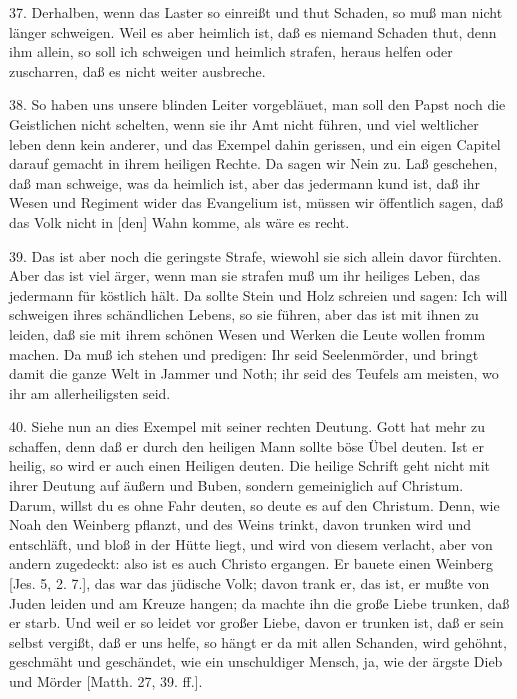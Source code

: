 37. Derhalben, wenn das Laster so einreißt und thut Schaden, so muß man nicht länger schweigen. Weil es aber heimlich ist, daß es niemand Schaden thut, denn ihm allein, so soll ich schweigen und heimlich strafen, heraus helfen oder zuscharren, daß es nicht weiter ausbreche.

38. So haben uns unsere blinden Leiter vorgebläuet, man soll den Papst noch die Geistlichen nicht schelten, wenn sie ihr Amt nicht führen, und viel weltlicher leben denn kein anderer, und das Exempel dahin gerissen, und ein eigen Capitel darauf gemacht in ihrem heiligen Rechte. Da sagen wir Nein zu. Laß geschehen, daß man schweige, was da heimlich ist, aber das jedermann kund ist, daß ihr Wesen und Regiment wider das Evangelium ist, müssen wir öffentlich sagen, daß das Volk nicht in [den] Wahn komme, als wäre es recht.

39. Das ist aber noch die geringste Strafe, wiewohl sie sich allein davor fürchten. Aber das ist viel ärger, wenn man sie strafen muß um ihr heiliges Leben, das jedermann für köstlich hält. Da sollte Stein und Holz schreien und sagen: Ich will schweigen ihres schändlichen Lebens, so sie führen, aber das ist mit ihnen zu leiden, daß sie mit ihrem schönen Wesen und Werken die Leute wollen fromm machen. Da muß ich stehen und predigen: Ihr seid Seelenmörder, und bringt damit die ganze Welt in Jammer und Noth; ihr seid des Teufels am meisten, wo ihr am allerheiligsten seid.

40. Siehe nun an dies Exempel mit seiner rechten Deutung. Gott hat mehr zu schaffen, denn daß er durch den heiligen Mann sollte böse
Übel deuten. Ist er heilig, so wird er auch einen Heiligen deuten. Die heilige Schrift geht nicht mit ihrer Deutung auf äußern und Buben, sondern gemeiniglich auf Christum. Darum, willst du es ohne Fahr deuten, so deute es auf den Christum. Denn, wie Noah den Weinberg pflanzt, und des Weins trinkt, davon trunken wird und entschläft, und bloß in der Hütte liegt, und wird von diesem verlacht, aber von andern zugedeckt: also ist es auch Christo ergangen. Er bauete einen Weinberg [Jes. 5, 2. 7.], das war das jüdische Volk; davon trank er, das ist, er mußte von Juden leiden und am Kreuze hangen; da machte ihn die große Liebe trunken, daß er starb. Und weil er so leidet vor großer Liebe, davon er trunken ist, daß er sein selbst vergißt, daß er uns helfe, so hängt er da mit allen Schanden, wird gehöhnt, geschmäht und geschändet, wie ein unschuldiger Mensch, ja, wie der ärgste Dieb und Mörder [Matth. 27, 39. ff.].

